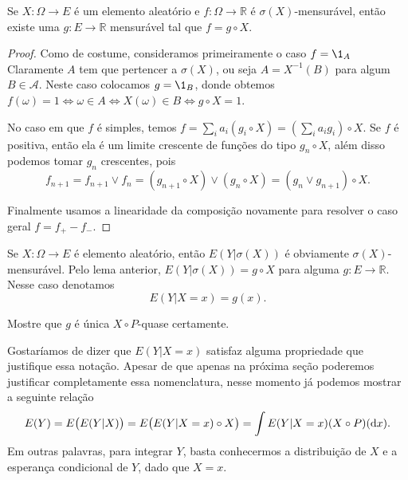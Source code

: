 \documentclass[../Notas_de_aula.tex]{subfiles}
\begin{document}
\begin{lemma}
  \label{l:f_g_circ_X}
  Se $X: \Omega \to E$ é um elemento aleatório e $f:\Omega \to \mathbb{R}$ é $\sigma(X)$-mensurável, então existe uma $g:E \to \mathbb{R}$ mensurável tal que $f = g \circ X$.
\end{lemma}

\begin{proof}
  Como de costume, consideramos primeiramente o caso $f = \1_A$
  Claramente $A$ tem que pertencer a $\sigma(X)$, ou seja $A = X^{-1}(B)$ para algum $B \in \mathcal{A}$.
  Neste caso colocamos $g = \1_B$, donde obtemos $f(\omega) = 1 \Leftrightarrow \omega \in A \Leftrightarrow X(\omega) \in B \Leftrightarrow g \circ X = 1$.

  No caso em que $f$ é simples, temos $f = \sum_i a_i (g_i \circ X) = (\sum_i a_i g_i) \circ X$.
  Se $f$ é positiva, então ela é um limite crescente de funções do tipo $g_n \circ X$, além disso podemos tomar $g_n$ crescentes, pois
  \begin{equation}
    f_{n+1} = f_{n+1} \vee f_{n} = (g_{n+1} \circ X) \vee (g_n \circ X) = (g_n \vee g_{n+1}) \circ X.
  \end{equation}

  Finalmente usamos a linearidade da composição novamente para resolver o caso geral $f = f_+ - f_-$.
\end{proof}

Se $X: \Omega \to E$ é elemento aleatório, então $E(Y|\sigma(X))$ é obviamente $\sigma(X)$-mensurável.
Pelo lema anterior, $E(Y|\sigma(X)) = g \circ X$ para alguma $g: E \to \mathbb{R}$.
Nesse caso denotamos
\begin{equation}
  E(Y|X = x) = g(x).
\end{equation}

\begin{exercise}
  Mostre que $g$ é única $X \circ P$-quase certamente.
\end{exercise}

Gostaríamos de dizer que $E(Y|X = x)$ satisfaz alguma propriedade que justifique essa notação.
Apesar de que apenas na próxima seção poderemos justificar completamente essa nomenclatura, nesse momento já podemos mostrar a seguinte relação
\begin{equation*}
  E(Y) = E\big( E(Y | X) \big) = E\big( E(Y | X = x) \circ X \big) = \int E(Y| X = x) (X \circ P) (\mathop{}\!\mathrm{d} x).
\end{equation*}
Em outras palavras, para integrar $Y$, basta conhecermos a distribuição de $X$ e a esperança condicional de $Y$, dado que $X = x$.
\end{document}
